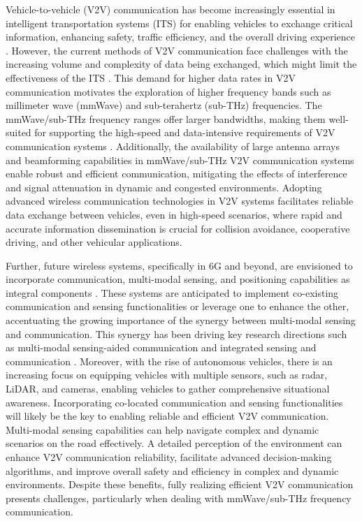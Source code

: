 \documentclass[10pt,comsoc]{IEEEtran}
\begin{document}
Vehicle-to-vehicle (V2V) communication has become increasingly essential in intelligent transportation systems (ITS) for enabling vehicles to exchange critical information, enhancing safety, traffic efficiency, and the overall driving experience \cite{harding2014vehicle}. However, the current methods of V2V communication face challenges with the increasing volume and complexity of data being exchanged, which might limit the effectiveness of the ITS \cite{zeadally2020tutorial}. This demand for higher data rates in V2V communication motivates the exploration of higher frequency bands such as millimeter wave (mmWave) and sub-terahertz (sub-THz) frequencies. The mmWave/sub-THz frequency ranges offer larger bandwidths, making them well-suited for supporting the high-speed and data-intensive requirements of V2V communication systems \cite{rappaport2019wireless}. Additionally, the availability of large antenna arrays and beamforming capabilities in mmWave/sub-THz V2V communication systems enable robust and efficient communication, mitigating the effects of interference and signal attenuation in dynamic and congested environments. Adopting advanced wireless communication technologies in V2V systems facilitates reliable data exchange between vehicles, even in high-speed scenarios, where rapid and accurate information dissemination is crucial for collision avoidance, cooperative driving, and other vehicular applications.


Further, future wireless systems, specifically in 6G and beyond, are envisioned to incorporate communication, multi-modal sensing, and positioning capabilities as integral components \cite{alkhateeb2023real, viswanathan2020communications}. These systems are anticipated to implement co-existing communication and sensing functionalities or leverage one to enhance the other, accentuating the growing importance of the synergy between multi-modal sensing and communication. This synergy has been driving key research directions such as multi-modal sensing-aided communication \cite{charan2022vision, charan2021vision, morais2022position, charan2022multi, jiang2022lidar, demirhan2022radar, charan2022drone, wu2023proactively, charan2022blockage} and integrated sensing and communication \cite{demirhan2023integrated}. Moreover, with the rise of autonomous vehicles, there is an increasing focus on equipping vehicles with multiple sensors, such as radar, LiDAR, and cameras, enabling vehicles to gather comprehensive situational awareness. Incorporating co-located communication and sensing functionalities will likely be the key to enabling reliable and efficient V2V communication. Multi-modal sensing capabilities can help navigate complex and dynamic scenarios on the road effectively. A detailed perception of the environment can enhance V2V communication reliability, facilitate advanced decision-making algorithms, and improve overall safety and efficiency in complex and dynamic environments. Despite these benefits, fully realizing efficient V2V communication presents challenges, particularly when dealing with mmWave/sub-THz frequency communication. 
 
\end{document}
